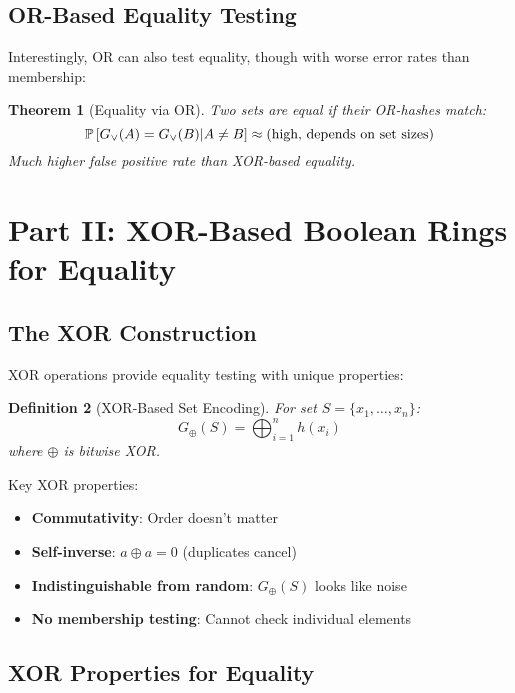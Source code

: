 \documentclass[11pt,final]{article}
\newcommand{\XOR}{\oplus}
\newcommand{\OR}{\lor}
\newtheorem{theorem}{Theorem}[section]
\newtheorem{definition}[theorem]{Definition}
\begin{document}
\subsection{OR-Based Equality Testing}

Interestingly, OR can also test equality, though with worse error rates than membership:

\begin{theorem}[Equality via OR]
Two sets are equal if their OR-hashes match:
\begin{equation}
\Prob{G_{\OR}(A) = G_{\OR}(B) | A \neq B} \approx \text{(high, depends on set sizes)}
\end{equation}
Much higher false positive rate than XOR-based equality.
\end{theorem}

\section{Part II: XOR-Based Boolean Rings for Equality}

\subsection{The XOR Construction}

XOR operations provide equality testing with unique properties:

\begin{definition}[XOR-Based Set Encoding]
For set $S = \{x_1, \ldots, x_n\}$:
\begin{equation}
G_{\XOR}(S) = \bigoplus_{i=1}^{n} h(x_i)
\end{equation}
where $\oplus$ is bitwise XOR.
\end{definition}

Key XOR properties:
\begin{itemize}
    \item \textbf{Commutativity}: Order doesn't matter
    \item \textbf{Self-inverse}: $a \oplus a = 0$ (duplicates cancel)
    \item \textbf{Indistinguishable from random}: $G_{\XOR}(S)$ looks like noise
    \item \textbf{No membership testing}: Cannot check individual elements
\end{itemize}

\subsection{XOR Properties for Equality}
\end{document}
